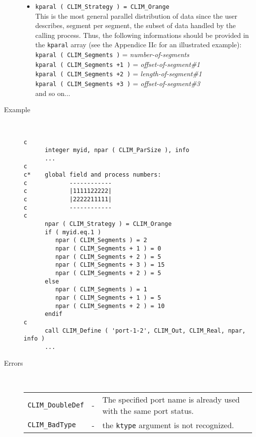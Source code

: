\begin{description}
\begin{itemize}
      \item  {\tt kparal ( CLIM\_Strategy ) = CLIM\_Orange} \\
        This is the most general parallel distribution of data since the
        user describes, segment per segment, the subset of data handled by the
        calling process. Thus, the following informations should be provided in
        the {\tt kparal} array 
        (see the Appendice IIc for an illustrated example):\\
        {\tt kparal ( CLIM\_Segments )} = {\it number-of-segments} \\
        {\tt kparal ( CLIM\_Segments +1 )} = {\it offset-of-segment\#1} \\
        {\tt kparal ( CLIM\_Segments +2 )} = {\it length-of-segment\#1} \\
        {\tt kparal ( CLIM\_Segments +3 )} = {\it offset-of-segment\#3} \\
        and so on...

    \end{itemize}

  \item[Example]~
    \begin{verbatim}
c
      integer myid, npar ( CLIM_ParSize ), info
      ...
c
c*    global field and process numbers:
c            ------------
c            |1111122222|
c            |2222211111|
c            ------------
c
      npar ( CLIM_Strategy ) = CLIM_Orange
      if ( myid.eq.1 )
         npar ( CLIM_Segments ) = 2
         npar ( CLIM_Segments + 1 ) = 0
         npar ( CLIM_Segments + 2 ) = 5
         npar ( CLIM_Segments + 3 ) = 15
         npar ( CLIM_Segments + 2 ) = 5
      else
         npar ( CLIM_Segments ) = 1
         npar ( CLIM_Segments + 1 ) = 5
         npar ( CLIM_Segments + 2 ) = 10
      endif
c
      call CLIM_Define ( 'port-1-2', CLIM_Out, CLIM_Real, npar, info )
      ...
    \end{verbatim}
  \item[Errors]~\\[10pt]
    \begin{tabular}{l l p{10cm} }
      {\tt CLIM\_DoubleDef} & - & The specified port name is already used
with the same port status.\\
      {\tt CLIM\_BadType} & - & the {\tt ktype} argument is not
recognized.\\
    \end{tabular}
\end{description}
%
%
